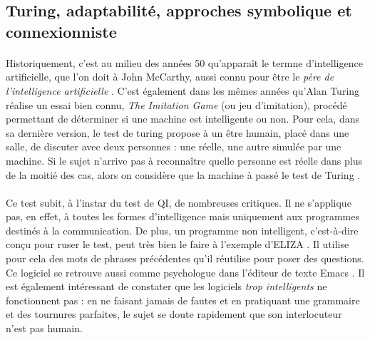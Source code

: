 \subsection*{Turing, adaptabilité, approches symbolique et connexionniste}

\paragraph{} Historiquement, c'est au milieu des années 50 qu'apparaît le termne d'intelligence artificielle, que l'on
doit à John McCarthy, aussi connu pour être le \emph{père de l'intelligence artificielle} \cite{AI2}. C'est également
dans les mêmes années qu'Alan Turing réalise un essai bien connu, \emph{The Imitation Game} (ou jeu d'imitation), procédé
permettant de déterminer si une machine est intelligente ou non. Pour cela, dans sa dernière version, le test de turing
propose à un être humain, placé dans une salle, de discuter avec deux personnes : une réelle, une autre simulée par une
machine. Si le sujet n'arrive pas à reconnaître quelle personne est réelle dans plus de la moitié des cas, alors on
considère que la machine à passé le test de Turing \cite{Turing0}.

\paragraph{} Ce test subit, à l'instar du test de QI, de nombreuses critiques. Il ne s'applique pas, en effet, à toutes
les formes d'intelligence mais uniquement aux programmes destinés à la communication. De plus, un programme \guillemotleft
non intelligent\guillemotright, c'est-à-dire conçu pour ruser le test, peut très bien le faire à l'exemple d'ELIZA \cite{Language0}.
Il utilise pour cela des mots de phrases précédentes qu'il réutilise pour poser des questions. Ce logiciel
se retrouve aussi comme psychologue dans l'éditeur de texte Emacs \cite{Therapy0}. Il est également intéressant de constater
que les logiciels \emph{trop intelligents} ne fonctionnent pas : en ne faisant jamais de fautes et en pratiquant une grammaire
et des tournures parfaites, le sujet se doute rapidement que son interlocuteur n'est pas humain.

